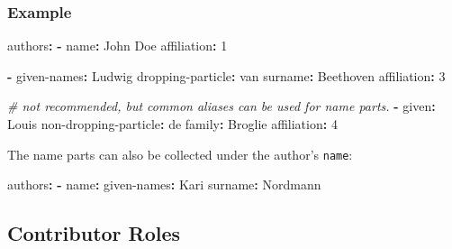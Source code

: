 \documentclass[10pt,a4paper,onecolumn]{article}
\newenvironment{Shaded}{}{}
\newcommand{\AttributeTok}[1]{\textcolor[rgb]{0.49,0.56,0.16}{#1}}
\newcommand{\CommentTok}[1]{\textcolor[rgb]{0.38,0.63,0.69}{\textit{#1}}}
\newcommand{\FunctionTok}[1]{\textcolor[rgb]{0.02,0.16,0.49}{#1}}
\newcommand{\KeywordTok}[1]{\textcolor[rgb]{0.00,0.44,0.13}{\textbf{#1}}}
\newcommand{\StringTok}[1]{\textcolor[rgb]{0.25,0.44,0.63}{#1}}
\begin{document}
\subsubsection{Example}\label{example}

\begin{Shaded}
\begin{Highlighting}[]
\FunctionTok{authors}\KeywordTok{:}
\AttributeTok{  }\KeywordTok{{-}}\AttributeTok{ }\FunctionTok{name}\KeywordTok{:}\AttributeTok{ John Doe}
\AttributeTok{    }\FunctionTok{affiliation}\KeywordTok{:}\AttributeTok{ }\StringTok{\textquotesingle{}1\textquotesingle{}}

\AttributeTok{  }\KeywordTok{{-}}\AttributeTok{ }\FunctionTok{given{-}names}\KeywordTok{:}\AttributeTok{ Ludwig}
\AttributeTok{    }\FunctionTok{dropping{-}particle}\KeywordTok{:}\AttributeTok{ van}
\AttributeTok{    }\FunctionTok{surname}\KeywordTok{:}\AttributeTok{ Beethoven}
\AttributeTok{    }\FunctionTok{affiliation}\KeywordTok{:}\AttributeTok{ }\StringTok{\textquotesingle{}3\textquotesingle{}}

\CommentTok{  \# not recommended, but common aliases can be used for name parts.}
\AttributeTok{  }\KeywordTok{{-}}\AttributeTok{ }\FunctionTok{given}\KeywordTok{:}\AttributeTok{ Louis}
\AttributeTok{    }\FunctionTok{non{-}dropping{-}particle}\KeywordTok{:}\AttributeTok{ de}
\AttributeTok{    }\FunctionTok{family}\KeywordTok{:}\AttributeTok{ Broglie}
\AttributeTok{    }\FunctionTok{affiliation}\KeywordTok{:}\AttributeTok{ }\StringTok{\textquotesingle{}4\textquotesingle{}}
\end{Highlighting}
\end{Shaded}

The name parts can also be collected under the author's \texttt{name}:

\begin{Shaded}
\begin{Highlighting}[]
\FunctionTok{authors}\KeywordTok{:}
\AttributeTok{  }\KeywordTok{{-}}\AttributeTok{ }\FunctionTok{name}\KeywordTok{:}
\AttributeTok{      }\FunctionTok{given{-}names}\KeywordTok{:}\AttributeTok{ Kari}
\AttributeTok{      }\FunctionTok{surname}\KeywordTok{:}\AttributeTok{ Nordmann}
\end{Highlighting}
\end{Shaded}

\subsection{Contributor Roles}\label{contributor-roles}
\end{document}

